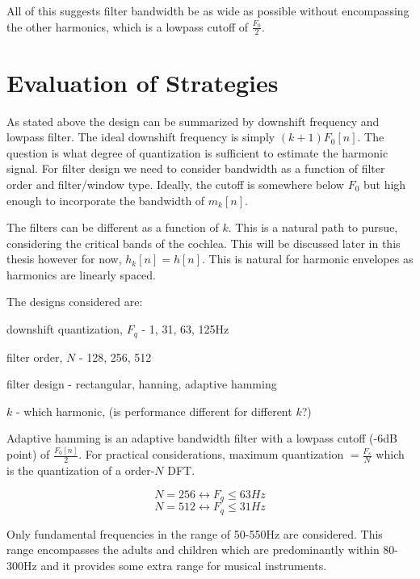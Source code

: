 \documentclass [11pt, proquest,oneside] {ganter_thesis}[2015/03/03]
\begin{document}
All of this suggests filter bandwidth be as wide as possible without encompassing the other harmonics, which is a lowpass cutoff of $\frac{F_0}{2}$.



\section{Evaluation of Strategies}

As stated above the design can be summarized by downshift frequency and lowpass filter.  The ideal downshift frequency is simply $(k+1)F_0[n]$.  The question is what degree of quantization is sufficient to estimate the harmonic signal.  For filter design we need to consider bandwidth as a function of filter order and filter/window type.  Ideally, the cutoff is somewhere below $F_0$ but high enough to incorporate the bandwidth of $m_k[n]$.

The filters can be different as a function of $k$.  This is a natural path to pursue, considering the critical bands of the cochlea.  This will be discussed later in this thesis however for now, $h_k[n] = h[n]$.  This is natural for harmonic envelopes as harmonics are linearly spaced.

The designs considered are:


downshift quantization, $F_q$ - 1, 31, 63, 125Hz

filter order, $N$ - 128, 256, 512

filter design - rectangular, hanning, adaptive hamming

$k$ - which harmonic, (is performance different for different $k$?)

Adaptive hamming is an adaptive bandwidth filter with a lowpass cutoff (-6dB point) of $\frac{F_0[n]}{2}$.  For practical considerations, maximum quantization $= \frac{F_s}{N}$ which is the quantization of a order-$N$ DFT.

$$N = 256 \longleftrightarrow F_q \leq 63Hz$$
$$N = 512 \longleftrightarrow F_q \leq 31Hz$$

Only fundamental frequencies in the range of 50-550Hz are considered. This range encompasses the adults and children which are predominantly within 80-300Hz \cite{vandali2005pitch} and it provides some extra range for musical instruments.
\end{document}
